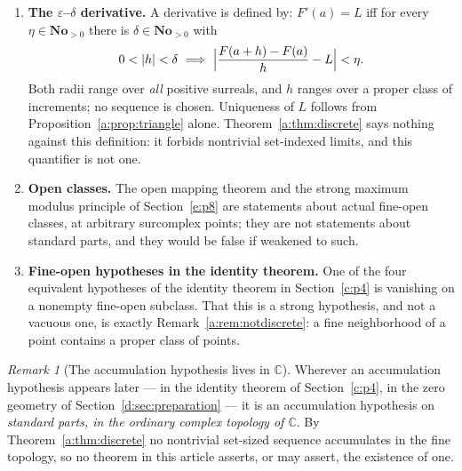 \documentclass[11pt,a4paper]{article}
\numberwithin{equation}{section}
\theoremstyle{definition}
\theoremstyle{remark}
\newtheorem{remark}[theorem]{Remark}
\theoremstyle{plain}
\newcommand{\No}{\mathbf{No}}
\newcommand{\CC}{\mathbb C}
\newcommand{\Hc}{\mathcal H}
\newcommand{\abs}[1]{\lvert #1\rvert}
\begin{document}
\begin{enumerate}[label=\textup{(\arabic*)},leftmargin=2.4em]
\item \textbf{The $\varepsilon$--$\delta$ derivative.}  A derivative is
defined by: $F'(a)=L$ iff for every $\eta\in\No_{>0}$ there is
$\delta\in\No_{>0}$ with
\[
 0<\abs h<\delta\ \Longrightarrow\
 \Bigl\lvert\frac{F(a+h)-F(a)}{h}-L\Bigr\rvert<\eta .
\]
Both radii range over \emph{all} positive surreals, and $h$ ranges over
a proper class of increments; no sequence is chosen.  Uniqueness of $L$
follows from Proposition~\ref{a:prop:triangle} alone.
Theorem~\ref{a:thm:discrete} says nothing against this definition: it
forbids nontrivial set-indexed limits, and this quantifier is not one.
\item \textbf{Open classes.}  The open mapping theorem and the strong
maximum modulus principle of Section~\ref{e:p8} are statements about actual
fine-open classes, at arbitrary surcomplex points; they are not
statements about standard parts, and they would be false if weakened to
such.
\item \textbf{Fine-open hypotheses in the identity theorem.}  One of the
four equivalent hypotheses of the identity theorem in Section~\ref{c:p4} is
vanishing on a nonempty fine-open subclass.  That this is a strong
hypothesis, and not a vacuous one, is exactly
Remark~\ref{a:rem:notdiscrete}: a fine neighborhood of a point contains
a proper class of points.
\end{enumerate}

\begin{remark}[The accumulation hypothesis lives in
$\CC$]\label{a:rule:accumulation}
Wherever an accumulation hypothesis appears later --- in the identity
theorem of Section~\ref{c:p4}, in the zero geometry of Section~\ref{d:sec:preparation} --- it is an
accumulation hypothesis on \emph{standard parts, in the ordinary complex
topology of $\CC$}.  By Theorem~\ref{a:thm:discrete} no nontrivial
set-sized sequence accumulates in the fine topology, so no theorem in
this article asserts, or may assert, the existence of one.
\end{remark}


\end{document}
